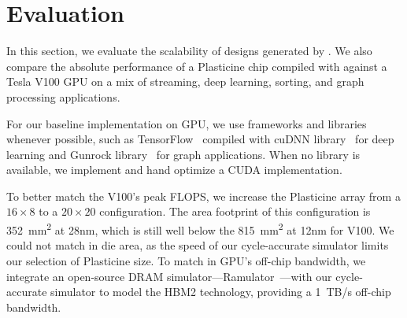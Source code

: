 \section{Evaluation} \label{sec:eval}

In this section, we evaluate the scalability of designs generated by \name.
We also compare the absolute performance of a Plasticine chip compiled with \name against a Tesla V100 GPU 
on a mix of streaming, deep learning, sorting, and graph processing applications.

For our baseline implementation on GPU, we use frameworks and libraries whenever possible, such as
TensorFlow~\cite{tensorflow} compiled
with cuDNN library~\cite{cuDNN} for deep learning and Gunrock library~\cite{gunrock} for graph applications.
When no library is available, we implement and hand optimize a CUDA implementation.

To better match the V100's peak FLOPS, 
we increase the Plasticine array from a $16\times8$ to a $20\times20$ configuration.
The area footprint of this configuration is \SI{352}{mm^2} at 28nm, which is still well below the 
\SI{815}{mm^2} at 12nm for V100.
We could not match in die area, as the speed of our cycle-accurate simulator limits our selection of Plasticine size.
To match in GPU's off-chip bandwidth, 
we integrate an open-source DRAM simulator---Ramulator~\cite{ramulator}---with our
cycle-accurate simulator to model the HBM2 technology, providing a \SI{1}{TB/s} off-chip bandwidth.

